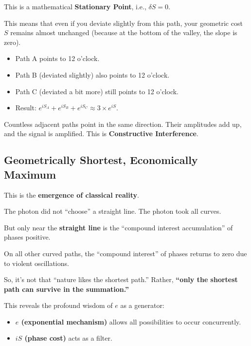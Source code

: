 \documentclass[11pt,a4paper,twoside]{book}
\begin{document}
This is a mathematical \textbf{Stationary Point}, i.e., $\delta S = 0$.

This means that even if you deviate slightly from this path, your geometric cost $S$ remains almost unchanged (because at the bottom of the valley, the slope is zero).

\begin{itemize}
\item Path A points to 12 o'clock.

\item Path B (deviated slightly) also points to 12 o'clock.

\item Path C (deviated a bit more) still points to 12 o'clock.

\item Result: \textbf{$e^{iS_A} + e^{iS_B} + e^{iS_C} \approx 3 \times e^{iS}$}.
\end{itemize}

Countless adjacent paths point in the same direction. Their amplitudes add up, and the signal is amplified. This is \textbf{Constructive Interference}.

\subsection{Geometrically Shortest, Economically Maximum}

This is the \textbf{emergence of classical reality}.

The photon did not ``choose'' a straight line. The photon took all curves.

But only near the \textbf{straight line} is the ``compound interest accumulation'' of phases positive.

On all other curved paths, the ``compound interest'' of phases returns to zero due to violent oscillations.

So, it's not that ``nature likes the shortest path.'' Rather, \textbf{``only the shortest path can survive in the summation.''}

This reveals the profound wisdom of $e$ as a generator:

\begin{itemize}
\item \textbf{$e$ (exponential mechanism)} allows all possibilities to occur concurrently.

\item \textbf{$iS$ (phase cost)} acts as a filter.
\end{itemize}
\end{document}
